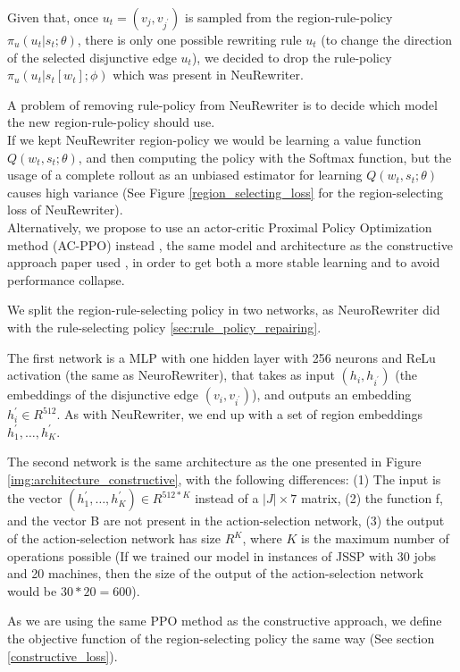 \documentclass[12pt]{article}
\begin{document}
\medbreak
Given that, once $u_t = (v_j,v_{j^{'}})$ is sampled from the region-rule-policy $\pi_{u}(u_t|s_t;\theta)$, 
there is only one possible rewriting rule $u_t$ (to change the direction of the selected disjunctive edge $u_t$), we decided to drop the rule-policy $\pi_{u}(u_t|s_t[w_t];\phi)$ which was present in NeuRewriter.

\medbreak
A problem of removing rule-policy from NeuRewriter is to decide which model the new region-rule-policy should use.\\
If we kept NeuRewriter region-policy we would be learning a value function $Q(w_t,s_t;\theta)$, and then computing the policy with the Softmax function, 
but the usage of a complete rollout as an unbiased estimator for learning $Q(w_t,s_t;\theta)$ causes high variance \cite{pierre_constructive_approach} (See Figure \ref{region_selecting_loss} for the region-selecting loss of NeuRewriter). \\
Alternatively, we propose to use an actor-critic Proximal Policy Optimization method (AC-PPO) instead \cite{ppo}, 
the same model and architecture as the constructive approach paper used \cite{pierre_constructive_approach}, in order to get both a more stable learning and to avoid performance collapse.

\medbreak
We split the region-rule-selecting policy in two networks, as NeuroRewriter did with the rule-selecting policy \ref{sec:rule_policy_repairing}.

\medbreak
The first network is a MLP with one hidden layer with 256 neurons and ReLu activation (the same as NeuroRewriter), that takes as input $(h_i,h_{i^{'}})$ (the embeddings of the disjunctive edge $(v_i,v_{i^{'}})$), and outputs an embedding $h_{i}^{'} \in R^{512}$. 
As with NeuRewriter, we end up with a set of region embeddings $h_{1}^{'},\dots,h_{K}^{'}$.

\medbreak
The second network is the same architecture as the one presented in Figure \ref{img:architecture_constructive}, with the following differences: (1) The input is the vector $(h_{1}^{'},\dots,h_{K}^{'}) \in R^{512*K}$ instead of a $|J|\times7$ matrix,
 (2) the function f, and the vector B are not present in the action-selection network, (3) the output of the action-selection network has size $R^{K}$, where $K$ is the maximum number of operations possible (If we trained our model in instances of JSSP with 30 jobs and 20 machines, then the size of the output of the action-selection network would be $30*20=600$).

 \medbreak
As we are using the same PPO method as the constructive approach, we define the objective function of the region-selecting policy the same way (See section \ref{constructive_loss}).\\
\end{document}
